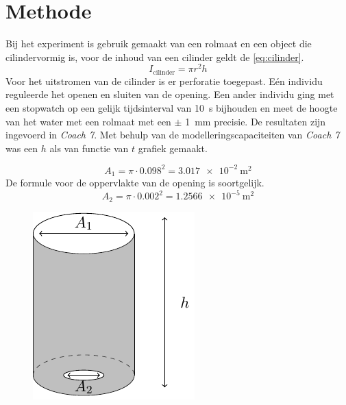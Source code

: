 \documentclass[numbers=endperiod]{scrartcl}
\begin{document}
\section{Methode}
Bij het experiment is gebruik gemaakt van een rolmaat en een object die cilindervormig is, voor de inhoud van een cilinder geldt de \ref{eq:cilinder}. 
\begin{equation}\label{eq:cilinder}
    I_{\text{cilinder}} = \pi r^2h
\end{equation}
Voor het uitstromen van de cilinder is er perforatie toegepast. Eén individu reguleerde het openen en sluiten van de opening. Een ander individu ging met een stopwatch op een gelijk tijdsinterval van \SI{10}{\second} bijhouden en meet de hoogte van het water met een rolmaat met een $\pm$ \SI{1}{\milli\meter} precisie. De resultaten zijn ingevoerd in \textit{Coach 7}. Met behulp van de modelleringscapaciteiten van \textit{Coach 7} was een $h$ als van functie van $t$ grafiek gemaakt.  


\begin{equation}
    A_1 = \pi \cdot 0.098^2 = \SI{3.017e-2}{\meter\squared}
\end{equation}
 De formule voor de oppervlakte van de opening is soortgelijk.
\begin{equation}
    A_2 = \pi \cdot 0.002^2 = \SI{1.2566e-5}{\meter\squared}
\end{equation}

\begin{figure}[ht]
\centering
\includegraphics[scale=0.8]{Beker.pdf}    
\label{fig:cilinder}
\end{figure}
\end{document}

